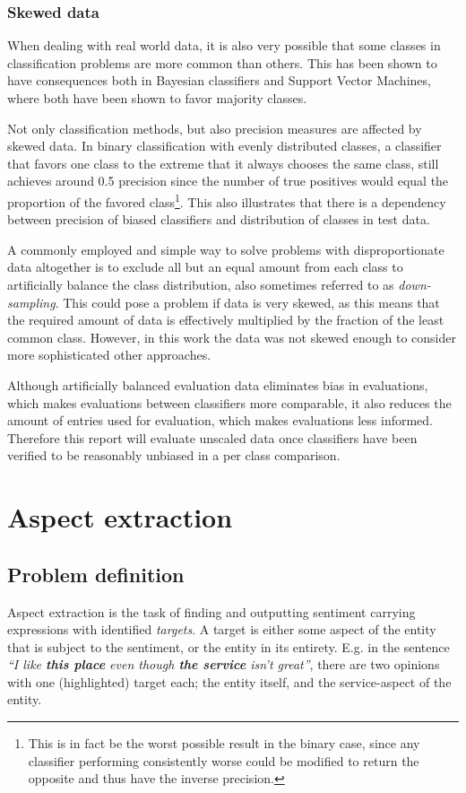 \documentclass[a4paper,11pt]{kth-mag}
\begin{document}
\subsection{Skewed data}
\label{subsec:bias}
When dealing with real world data, it is also very possible that some classes in classification problems are more common than others. This has been shown to have consequences both in Bayesian classifiers\cite{rennie2003bias} and Support Vector Machines\cite{svm_bias}, where both have been shown to favor majority classes\cite{rennie2003bias, svm_bias}.

Not only classification methods, but also precision measures are affected by skewed data. In binary classification with evenly distributed classes, a classifier that favors one class to the extreme that it always chooses the same class, still achieves around 0.5 precision since the number of true positives would equal the proportion of the favored class\footnote{This is in fact be the worst possible result in the binary case, since any classifier performing consistently worse could be modified to return the opposite and thus have the inverse precision.}. This also illustrates that there is a dependency between precision of biased classifiers and distribution of classes in test data.

A commonly employed and simple way to solve problems with disproportionate data altogether is to exclude all but an equal amount from each class to artificially balance the class distribution, also sometimes referred to as \emph{down-sampling}\cite{provost2000machine}. This could pose a problem if data is very skewed, as this means that the required amount of data is effectively multiplied by the fraction of the least common class. However, in this work the data was not skewed enough to consider more sophisticated other approaches.

Although artificially balanced evaluation data eliminates bias in evaluations, which makes evaluations between classifiers more comparable, it also reduces the amount of entries used for evaluation, which makes evaluations less informed. Therefore this report will evaluate unscaled data once classifiers have been verified to be reasonably unbiased in a per class comparison.


\chapter{Aspect extraction}

\section{Problem definition}
Aspect extraction is the task of finding and outputting sentiment carrying expressions with identified \emph{targets}. A target is either some aspect of the entity that is subject to the sentiment, or the entity in its entirety. E.g. in the sentence \emph{``I like \textbf{this place} even though \textbf{the service} isn't great''},  there are two opinions with one (highlighted) target each; the entity itself, and the service-aspect of the entity.
\end{document}
